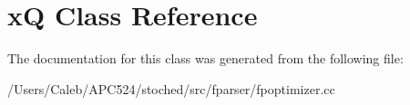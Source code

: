 \hypertarget{classx_q}{}\section{xQ Class Reference}
\label{classx_q}


The documentation for this class was generated from the following file\+:\begin{DoxyCompactItemize}
\item 
/\+Users/\+Caleb/\+A\+P\+C524/stoched/src/fparser/fpoptimizer.\+cc\end{DoxyCompactItemize}
